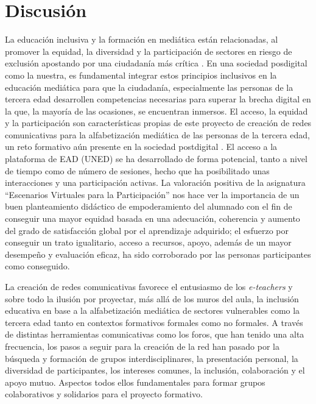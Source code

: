 \section{Discusión}\label{sec-discusión}

La educación inclusiva y la formación en mediática están relacionadas,
al promover la equidad, la diversidad y la participación de sectores en
riesgo de exclusión apostando por una ciudadanía más crítica \cite{Xie2021}. En una sociedad posdigital como la nuestra, es fundamental
integrar estos principios inclusivos en la educación mediática para que
la ciudadanía, especialmente las personas de la tercera edad desarrollen
competencias necesarias para superar la brecha digital en la que, la
mayoría de las ocasiones, se encuentran inmersos. El acceso, la equidad
y la participación son características propias de este proyecto de
creación de redes comunicativas para la alfabetización mediática de las
personas de la tercera edad, un reto formativo aún presente en la
sociedad postdigital \cite{hernando2013}. El acceso a la
plataforma de EAD (UNED) se ha desarrollado de forma potencial, tanto a
nivel de tiempo como de número de sesiones, hecho que ha posibilitado
unas interacciones y una participación activas. La valoración positiva
de la asignatura ``Escenarios Virtuales para la Participación'' nos hace
ver la importancia de un buen planteamiento didáctico de empoderamiento
del alumnado con el fin de conseguir una mayor equidad basada en una
adecuación, coherencia y aumento del grado de satisfacción global por el
aprendizaje adquirido; el esfuerzo por conseguir un trato igualitario,
acceso a recursos, apoyo, además de un mayor desempeño y evaluación
eficaz, ha sido corroborado por las personas participantes como
conseguido.

La creación de redes comunicativas favorece el entusiasmo de los
\emph{e-teachers} y sobre todo la ilusión por proyectar, más allá de los
muros del aula, la inclusión educativa en base a la alfabetización
mediática de sectores vulnerables como la tercera edad tanto en
contextos formativos formales como no formales. A través de distintas
herramientas comunicativas como los foros, que han tenido una alta
frecuencia, los pasos a seguir para la creación de la red han pasado por
la búsqueda y formación de grupos interdisciplinares, la presentación
personal, la diversidad de participantes, los intereses comunes, la
inclusión, colaboración y el apoyo mutuo. Aspectos todos ellos
fundamentales para formar grupos colaborativos y solidarios para el
proyecto formativo.

